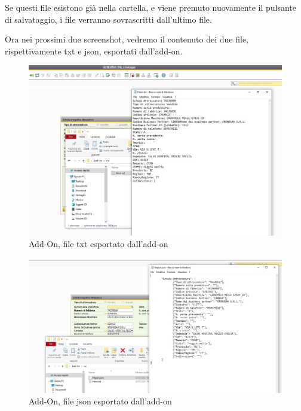 	Se questi file esistono già nella cartella, e viene premuto nuovamente il pulsante di salvataggio, i file verranno sovrascritti dall'ultimo file.
	


\newpage


	
	Ora nei prossimi due screenshot, vedremo il contenuto dei due file, rispettivamente txt e json, esportati dall'add-on.
	

\begin{figure}[!h] 
	\centering 
	\includegraphics[scale = 0.38]{immagini/add-on/addon-esporta-txt.jpg} 
	\caption{Add-On, file txt esportato dall'add-on}
\end{figure}

\begin{figure}[!h] 
	\centering 
	\includegraphics[scale = 0.38]{immagini/add-on/addon-esporta-json.jpg} 
	\caption{Add-On, file json esportato dall'add-on}
\end{figure}

\newpage

